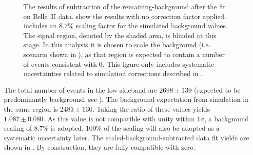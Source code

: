 \begin{figure}[htbp!]
    \centering
    \caption{\label{fig:sidebands_subtracted_figures} The results of subtraction of the remaining-\BB background after the fit on Belle~II data.
     show the results with no correction factor applied.
     includes an 8.7\% scaling factor for the simulated background values.
    The signal region, denoted by the shaded area, is blinded at this stage.
    In this analysis it is chosen to scale the background (i.e. scenario shown in ),
    as that region is expected to contain a number of \BtoXsgamma events consistent with 0.
    This figure only includes systematic uncertainties related to simulation corrections described in .
    }
\end{figure}

The total number of events in the low-\EB sideband are $2698\pm139$ (expected to be predominantly background, see ).
The background expectation from simulation in the same region is $2483\pm130$.
Taking the ratio of these values yields $1.087\pm0.080$.
As this value is not compatible with unity within $1\sigma$, a background scaling of 8.7\% is adopted.
100\% of the scaling will also be adopted as a systematic uncertainty later.
The scaled-background-subtracted data fit yields are shown in .
By construction, they are fully compatible with zero.

